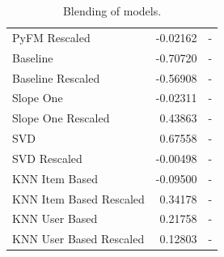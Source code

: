 \documentclass[10pt,conference,compsocconf]{IEEEtran}
\begin{document}
\begin{table}[htbp]
\begin{tabular}[c]{| l r l |}
PyFM Rescaled                           			& -0.02162					& -\\
Baseline                                 				& -0.70720					& -\\
Baseline Rescaled                       			& -0.56908					& -\\
Slope One                               				& -0.02311					& -\\
Slope One Rescaled                     			& 0.43863					& -\\
SVD                                      				& 0.67558					& -\\
SVD Rescaled                            			& -0.00498					& -\\
KNN Item Based                                  		& -0.09500					& -\\
KNN Item Based Rescaled                        		& 0.34178					& -\\
KNN User Based                                  		& 0.21758					& -\\
KNN User Based Rescaled                       		& 0.12803					& -\\



\hline

\end{tabular}
  \caption{Blending of models.}
  \label{blending}
\end{table}
\end{document}
